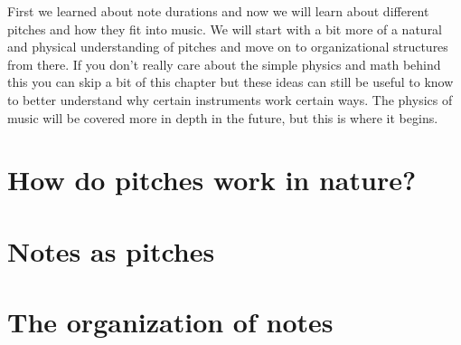 \documentclass[../OpenAppliedMusicTheory.tex]{subfiles}
\begin{document}
    
    First we learned about note durations and now we will learn about different pitches and how they fit into music. We will start with a bit more of a natural and physical understanding of pitches and move on to organizational structures from there. If you don't really care about the simple physics and math behind this you can skip a bit of this chapter but these ideas can still be useful to know to better understand why certain instruments work certain ways. The physics of music will be covered more in depth in the future, but this is where it begins. %

    \section{How do pitches work in nature?}\label{ch3:pitches-in-nature}

    \section{Notes as pitches}\label{ch3:note-pitches}

    \section{The organization of notes}
\end{document}
